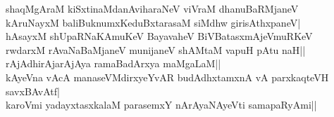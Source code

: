 \begin{shloka}
shaqMgAraM kiSxtinaMdanAviharaNeV viVraM dhanuBaRMjaneV\label{219b}\\
kAruNayxM baliBuknumxKe\s duBxtarasaM siMdhw girisAthxpaneV|\\
hAsayxM shUpaRNaKAmuKeV BayavaheV BiVBatasxmAjeVmuRKeV\\
rwdarxM rAvaNaBaMjaneV munijaneV shAMtaM vapuH pAtu naH||\\
rAjAdhirAjarAjAya ramaBadArxya maMgaLaM||\\
kAyeVna vAcA manaseVMdirxyeYvAR budAdhxtamxnA vA parxkaqteVH savxBAvAtf|\label{219}\\
karoVmi yadayxtasxkalaM parasemxY nArAyaNAyeVti samapaRyAmi||
\end{shloka}
